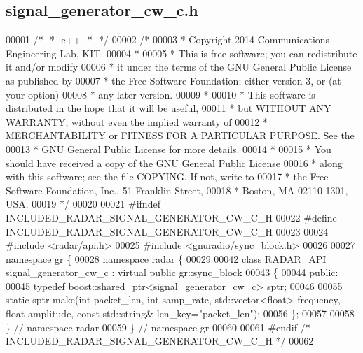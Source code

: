 \subsection{signal\+\_\+generator\+\_\+cw\+\_\+c.\+h}
\label{signal__generator__cw__c_8h_source}

\begin{DoxyCode}
00001 \textcolor{comment}{/* -*- c++ -*- */}
00002 \textcolor{comment}{/* }
00003 \textcolor{comment}{ * Copyright 2014 Communications Engineering Lab, KIT.}
00004 \textcolor{comment}{ * }
00005 \textcolor{comment}{ * This is free software; you can redistribute it and/or modify}
00006 \textcolor{comment}{ * it under the terms of the GNU General Public License as published by}
00007 \textcolor{comment}{ * the Free Software Foundation; either version 3, or (at your option)}
00008 \textcolor{comment}{ * any later version.}
00009 \textcolor{comment}{ * }
00010 \textcolor{comment}{ * This software is distributed in the hope that it will be useful,}
00011 \textcolor{comment}{ * but WITHOUT ANY WARRANTY; without even the implied warranty of}
00012 \textcolor{comment}{ * MERCHANTABILITY or FITNESS FOR A PARTICULAR PURPOSE.  See the}
00013 \textcolor{comment}{ * GNU General Public License for more details.}
00014 \textcolor{comment}{ * }
00015 \textcolor{comment}{ * You should have received a copy of the GNU General Public License}
00016 \textcolor{comment}{ * along with this software; see the file COPYING.  If not, write to}
00017 \textcolor{comment}{ * the Free Software Foundation, Inc., 51 Franklin Street,}
00018 \textcolor{comment}{ * Boston, MA 02110-1301, USA.}
00019 \textcolor{comment}{ */}
00020  
00021 \textcolor{preprocessor}{#ifndef INCLUDED\_RADAR\_SIGNAL\_GENERATOR\_CW\_C\_H}
00022 \textcolor{preprocessor}{#define INCLUDED\_RADAR\_SIGNAL\_GENERATOR\_CW\_C\_H}
00023 
00024 \textcolor{preprocessor}{#include <radar/api.h>}
00025 \textcolor{preprocessor}{#include <gnuradio/sync\_block.h>}
00026 
00027 \textcolor{keyword}{namespace }gr \{
00028   \textcolor{keyword}{namespace }radar \{
00029 
00042     \textcolor{keyword}{class }RADAR_API signal_generator_cw_c : \textcolor{keyword}{virtual} \textcolor{keyword}{public} gr::sync\_block
00043     \{
00044      \textcolor{keyword}{public}:
00045       \textcolor{keyword}{typedef} boost::shared\_ptr<signal\_generator\_cw\_c> sptr;
00046 
00055       \textcolor{keyword}{static} sptr make(\textcolor{keywordtype}{int} packet\_len, \textcolor{keywordtype}{int} samp_rate, std::vector<float> 
      frequency, \textcolor{keywordtype}{float} amplitude, \textcolor{keyword}{const} std::string& len\_key=\textcolor{stringliteral}{"packet\_len"});
00056     \};
00057 
00058   \} \textcolor{comment}{// namespace radar}
00059 \} \textcolor{comment}{// namespace gr}
00060 
00061 \textcolor{preprocessor}{#endif }\textcolor{comment}{/* INCLUDED\_RADAR\_SIGNAL\_GENERATOR\_CW\_C\_H */}\textcolor{preprocessor}{}
00062 
\end{DoxyCode}
